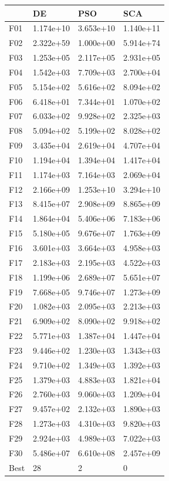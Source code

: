 \begin{tabular}{llll}
\toprule
{} &         DE &        PSO &        SCA \\
\midrule
F01  &  1.174e+10 &  3.653e+10 &  1.140e+11 \\
F02  &  2.322e+59 &  1.000e+00 &  5.914e+74 \\
F03  &  1.253e+05 &  2.117e+05 &  2.931e+05 \\
F04  &  1.542e+03 &  7.709e+03 &  2.700e+04 \\
F05  &  5.154e+02 &  5.616e+02 &  8.094e+02 \\
F06  &  6.418e+01 &  7.344e+01 &  1.070e+02 \\
F07  &  6.033e+02 &  9.928e+02 &  2.325e+03 \\
F08  &  5.094e+02 &  5.199e+02 &  8.028e+02 \\
F09  &  3.435e+04 &  2.619e+04 &  4.707e+04 \\
F10  &  1.194e+04 &  1.394e+04 &  1.417e+04 \\
F11  &  1.174e+03 &  7.164e+03 &  2.069e+04 \\
F12  &  2.166e+09 &  1.253e+10 &  3.294e+10 \\
F13  &  8.415e+07 &  2.908e+09 &  8.865e+09 \\
F14  &  1.864e+04 &  5.406e+06 &  7.183e+06 \\
F15  &  5.180e+05 &  9.676e+07 &  1.763e+09 \\
F16  &  3.601e+03 &  3.664e+03 &  4.958e+03 \\
F17  &  2.183e+03 &  2.195e+03 &  4.522e+03 \\
F18  &  1.199e+06 &  2.689e+07 &  5.651e+07 \\
F19  &  7.668e+05 &  9.746e+07 &  1.273e+09 \\
F20  &  1.082e+03 &  2.095e+03 &  2.213e+03 \\
F21  &  6.909e+02 &  8.090e+02 &  9.918e+02 \\
F22  &  5.771e+03 &  1.387e+04 &  1.447e+04 \\
F23  &  9.446e+02 &  1.230e+03 &  1.343e+03 \\
F24  &  9.710e+02 &  1.349e+03 &  1.392e+03 \\
F25  &  1.379e+03 &  4.883e+03 &  1.821e+04 \\
F26  &  2.760e+03 &  9.060e+03 &  1.209e+04 \\
F27  &  9.457e+02 &  2.132e+03 &  1.890e+03 \\
F28  &  1.273e+03 &  4.310e+03 &  9.820e+03 \\
F29  &  2.924e+03 &  4.989e+03 &  7.022e+03 \\
F30  &  5.486e+07 &  6.610e+08 &  2.457e+09 \\
Best &         28 &          2 &          0 \\
\bottomrule
\end{tabular}
